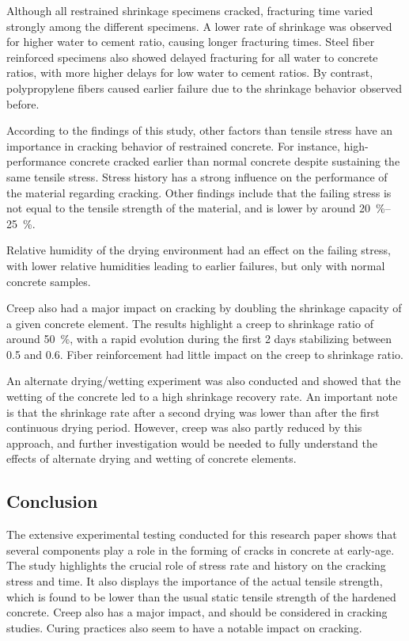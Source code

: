 \documentclass[a4paper,11pt]{memoir}
\begin{document}
Although all restrained shrinkage specimens cracked, fracturing time varied
strongly among the different specimens. A lower rate of shrinkage was observed
for higher water to cement ratio, causing longer fracturing times. Steel
fiber reinforced specimens also showed delayed fracturing for all water to
concrete ratios, with more higher delays for low water to cement ratios. By
contrast, polypropylene fibers caused earlier failure due to the shrinkage
behavior observed before.

According to the findings of this study, other factors than tensile stress have
an importance in cracking behavior of restrained concrete. For instance,
high-performance concrete cracked earlier than normal concrete despite
sustaining the same tensile stress. Stress history has a strong influence on
the performance of the material regarding cracking. Other findings include that
the failing stress is not equal to the tensile strength of the material, and is
lower by around \SIrange{20}{25}{\percent}.

Relative humidity of the drying environment had an effect on the failing
stress, with lower relative humidities leading to earlier failures, but only
with normal concrete samples.

Creep also had a major impact on cracking by doubling the shrinkage capacity of
a given concrete element. The results highlight a creep to shrinkage ratio of
around \SI{50}{\percent}, with a rapid evolution during the first 2 days
stabilizing between \num{0.5} and \num{.6}. Fiber reinforcement had little
impact on the creep to shrinkage ratio.

An alternate drying/wetting experiment was also conducted and showed that the
wetting of the concrete led to a high shrinkage recovery rate. An important
note is that the shrinkage rate after a second drying was lower than after the
first continuous drying period. However, creep was also partly reduced by this
approach, and further investigation would be needed to fully understand the
effects of alternate drying and wetting of concrete elements.

\subsection{Conclusion}
The extensive experimental testing conducted for this research paper shows that
several components play a role in the forming of cracks in concrete at
early-age. The study highlights the crucial role of stress rate and history on
the cracking stress and time. It also displays the importance of the actual
tensile strength, which is found to be lower than the usual static tensile
strength of the hardened concrete. Creep also has a major impact, and should be
considered in cracking studies. Curing practices also seem to have a notable
impact on cracking.
\end{document}
